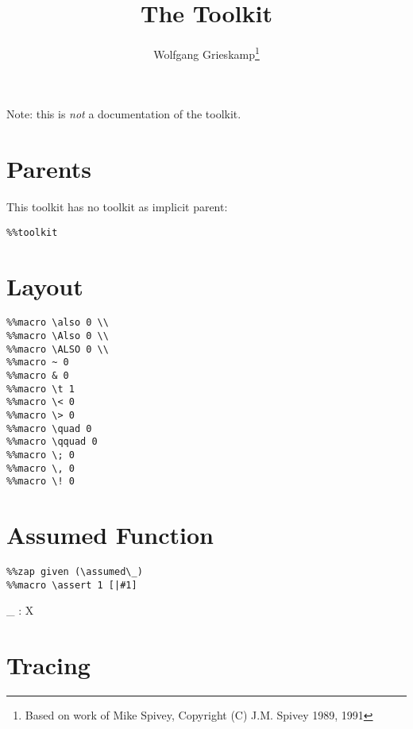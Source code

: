 \documentclass{article}
\begin{document}
\title{The \Zeta{} Toolkit}
\author{Wolfgang Grieskamp\thanks{Based on work of Mike Spivey, Copyright (C) J.M. Spivey 1989, 1991}}
\maketitle 

Note: this is \emph{not} a documentation of the toolkit.

\section{Parents}

This toolkit has no toolkit as implicit parent:

\begin{verbatim}
%%toolkit
\end{verbatim}


\section{Layout}

\begin{verbatim}
%%macro \also 0 \\
%%macro \Also 0 \\
%%macro \ALSO 0 \\
%%macro ~ 0
%%macro & 0
%%macro \t 1
%%macro \< 0
%%macro \> 0
%%macro \quad 0
%%macro \qquad 0
%%macro \; 0
%%macro \, 0
%%macro \! 0
\end{verbatim}

\section{Assumed Function}


\begin{verbatim}
%%zap given (\assumed\_)
%%macro \assert 1 [|#1]
\end{verbatim}

\begin{axdef}[X]
  \assumed \_ : \power X
\end{axdef}


\section{Tracing}
\end{document}
